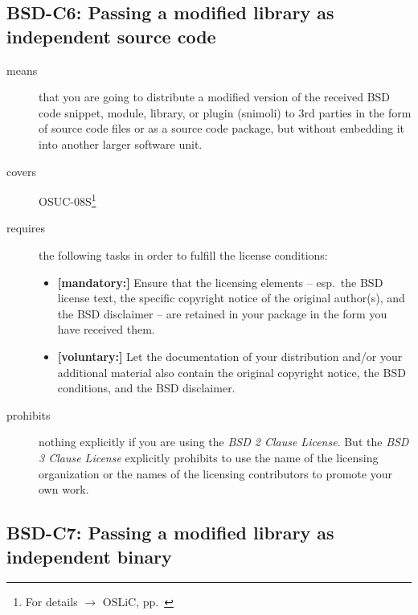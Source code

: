 \subsection{BSD-C6: Passing a modified library as independent source code}
\label{OSUC-08S-BSD}
\begin{description}
\item[means] that you are going to distribute a modified version of the received
BSD code snippet, module, library, or plugin (snimoli) to 3rd parties in the
form of source code files or as a source code package, but without embedding it
into another larger software unit.
\item[covers] OSUC-08S\footnote{For details $\rightarrow$ OSLiC, pp.\ \pageref{OSUC-08S-DEF}}
\item[requires] the following tasks in order to fulfill the license conditions:
\begin{itemize}
  \item \textbf{[mandatory:]} Ensure that the licensing elements -- esp.\ the
  BSD license text, the specific copyright notice of the original author(s), and
  the BSD disclaimer -- are retained in your package in the form you have
  received them.
  \item \textbf{[voluntary:]} Let the documentation of your distribution
  and/or your additional material also contain the original copyright notice, the
  BSD conditions, and the BSD disclaimer.
\end{itemize}

\item[prohibits] nothing explicitly if you are using the \emph{BSD 2 Clause
License}. But the \emph{BSD 3 Clause License} explicitly prohibits to use the
name of the licensing organization or the names of the licensing contributors to
promote your own work.

\end{description}


\subsection{BSD-C7: Passing a modified library as independent binary}
\label{OSUC-08B-BSD}

